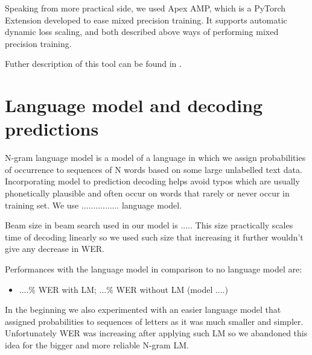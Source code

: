 \documentclass[licencjacka,en]{pracamgr}
\begin{document}
Speaking from more practical side, we used Apex AMP, which is a PyTorch Extension developed to ease mixed precision training. It supports automatic dynamic loss scaling, and both described above ways of performing mixed precision training.

Futher description of this tool can be found in \cite{APEX_DOCS}.
\section{Language model and decoding predictions}
N-gram language model is a model of a language in which we assign probabilities of occurrence to sequences of N words based on some large unlabelled text data. Incorporating model to prediction decoding helps avoid typos which are usually phonetically plausible and often occur on words that rarely or never occur in training set. We use ................ language model.

Beam size in beam search used in our model is ..... This size practically scales time of decoding linearly so we used such size that increasing it further wouldn't give any decrease in WER.

Performances with the language model in comparison to no language model are:
\begin{itemize}
  \item ....\% WER with LM; ...\% WER without LM (model ....)
\end{itemize}

In the beginning we also experimented with an easier language model that assigned probabilities to sequences of letters as it was much smaller and simpler. Unfortunately WER was increasing after applying such LM so we abandoned this idea for the bigger and more reliable N-gram LM.
\end{document}
